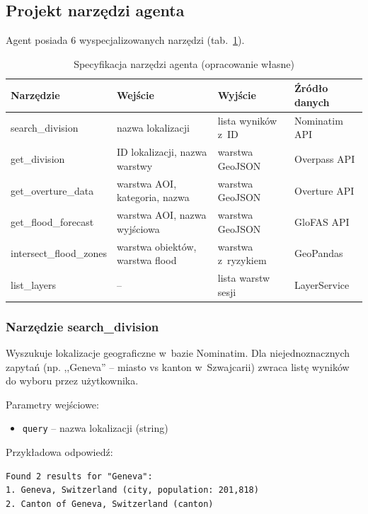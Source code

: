 \subsection{Projekt narzędzi agenta}

Agent posiada 6 wyspecjalizowanych narzędzi (tab.~\ref{tab:narzedzia_szczegoly}).

\begin{table}[H]
    \centering
    \caption{Specyfikacja narzędzi agenta (opracowanie własne)}
    \begin{tabular}{|l|p{4cm}|p{4cm}|p{3cm}|}
        \hline
        \textbf{Narzędzie} & \textbf{Wejście} & \textbf{Wyjście} & \textbf{Źródło danych} \\
        \hline
        search\_division & nazwa lokalizacji & lista wyników z~ID & Nominatim API \\
        \hline
        get\_division & ID lokalizacji, nazwa warstwy & warstwa GeoJSON & Overpass API \\
        \hline
        get\_overture\_data & warstwa AOI, kategoria, nazwa & warstwa GeoJSON & Overture API \\
        \hline
        get\_flood\_forecast & warstwa AOI, nazwa wyjściowa & warstwa GeoJSON & GloFAS API \\
        \hline
        intersect\_flood\_zones & warstwa obiektów, warstwa flood & warstwa z~ryzykiem & GeoPandas \\
        \hline
        list\_layers & -- & lista warstw sesji & LayerService \\
        \hline
    \end{tabular}
    \label{tab:narzedzia_szczegoly}
\end{table}

\subsubsection{Narzędzie search\_division}

Wyszukuje lokalizacje geograficzne w~bazie Nominatim. Dla niejednoznacznych zapytań (np. ,,Geneva'' -- miasto vs kanton w~Szwajcarii) zwraca listę wyników do wyboru przez użytkownika.

Parametry wejściowe:
\begin{itemize}
    \item \texttt{query} -- nazwa lokalizacji (string)
\end{itemize}

Przykładowa odpowiedź:
\begin{verbatim}
Found 2 results for "Geneva":
1. Geneva, Switzerland (city, population: 201,818)
2. Canton of Geneva, Switzerland (canton)
\end{verbatim}


